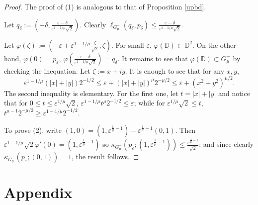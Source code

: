 \documentclass[a4paper,12pt]{amsart}
\def\D{\mathbb D}
\newcommand{\eps}{\varepsilon}
\begin{document}
\begin{proof}
The proof of (1) is analogous to that of Proposition \ref{upbd}. 

Let $q_\delta:= \left(-\delta, \frac{\eps-\delta}{\eps^{1-1/\mu} \sqrt2}\right)$. 
Clearly $\ell_{G^-_\mu}(q_\delta,p_\delta)\le \frac{\eps-\delta}{\eps^{1-1/\mu} \sqrt2}$.

Let $\varphi(\zeta):= (-\eps+\eps^{1-1/\mu}\frac\zeta{\sqrt 2}, \zeta)$. For small $\eps$, $\varphi(\D)\subset \D^2$. 
On the other hand, $\varphi(0)= p_\eps$, $\varphi\left(\frac{\eps-\delta}{\eps^{1-1/\mu} \sqrt2}\right) = q_\delta$. It remains
to see that $\varphi(\D)\subset G^-_\mu$ by checking the inequation.  Let $\zeta:= x+iy$. It is enough to see that 
for any $x,y$,
\[
\eps^{1-1/\mu} (|x|+|y|) 2^{-1/2} \le \eps + (|x|+|y|)^\mu 2^{-\mu/2} \le \eps + (x^2+y^2)^{\mu/2}.
\]
The second inequality is elementary.  For the first one, let $t=|x|+|y|$ and notice that for $0\le t \le \eps^{1/\mu} \sqrt2$, $\eps^{1-1/\mu} t^\mu 2^{-1/2}\le \eps$; while for $\eps^{1/\mu} \sqrt2\le t$, $t^{\mu-1} 2^{-\mu/2} \ge \eps^{1-1/\mu} 2^{-1/2}$.

To prove (2), write $(1,0)= (1, \eps^{\frac1\mu-1} ) - \eps^{\frac1\mu-1} (0,1)$. Then 
$ \eps^{1-1/\mu} \sqrt2 \varphi'(0) = (1, \eps^{\frac1\mu-1} )$
so $ \kappa_{G^-_\mu} (p_\eps; (1, \eps^{\frac1\mu-1} ) ) \le\frac{\eps^{\frac1{\mu}-1}}{\sqrt 2}$; and since
clearly $\kappa_{G^-_\mu} (p_\eps; (0,1) ) =1$, the result follows.
\end{proof}

\section{Appendix}
\label{appen}
\end{document}

